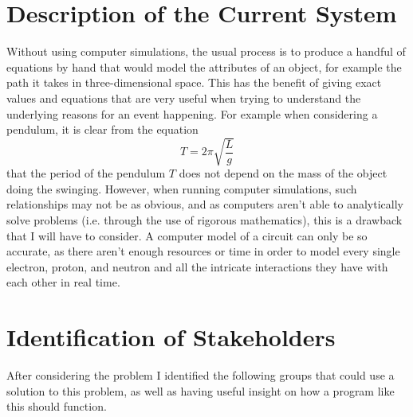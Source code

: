 
    

\section{Description of the Current System}

    Without using computer simulations, the usual process is to produce a handful of equations by hand that would model the attributes of an object, for example the path it takes in three-dimensional space. 
    This has the benefit of giving exact values and equations that are very useful when trying to understand the underlying reasons for an event happening. 
    For example when considering a pendulum, it is clear from the equation $$ T = 2 \pi \sqrt{\frac{L}{g}} $$ that the period of the pendulum $T$ does not depend on the mass of the object doing the swinging. 
    However, when running computer simulations, such relationships may not be as obvious, and as computers aren't able to analytically solve problems (i.e. through the use of rigorous mathematics), this is a drawback that I will have to consider. 
    A computer model of a circuit can only be so accurate, as there aren't enough resources or time in order to model every single electron, proton, and neutron and all the intricate interactions they have with each other in real time.


\section{Identification of Stakeholders}

    After considering the problem I identified the following groups that could use a solution to this problem, as well as having useful insight on how a program like this should function.


